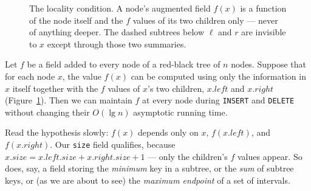 \begin{figure}[H]
\centering
{}
\caption{The locality condition. A node's augmented field $f(x)$ is a function of
the node itself and the $f$ values of its two children only --- never of anything
deeper. The dashed subtrees below $\ell$ and $r$ are invisible to $x$ except
through those two summaries.}
\label{ch14:fig-locality}
\end{figure}

\begin{theorem}
\label{ch14:augment-theorem}
Let $f$ be a field added to every node of a red-black tree of $n$ nodes. Suppose
that for each node $x$, the value $f(x)$ can be computed using only the
information in $x$ itself together with the $f$ values of $x$'s two children,
$x.\mathit{left}$ and $x.\mathit{right}$ (Figure~\ref{ch14:fig-locality}). Then we
can maintain $f$ at every node during \texttt{INSERT} and \texttt{DELETE} without
changing their $O(\lg n)$ asymptotic running time.
\end{theorem}

\begin{remark}
Read the hypothesis slowly: $f(x)$ depends only on $x$, $f(x.\mathit{left})$, and
$f(x.\mathit{right})$. Our \texttt{size} field qualifies, because
$x.\mathit{size} = x.\mathit{left}.\mathit{size} + x.\mathit{right}.\mathit{size}
+ 1$ --- only the children's $f$ values appear. So does, say, a field storing the
\emph{minimum} key in a subtree, or the \emph{sum} of subtree keys, or (as we are
about to see) the \emph{maximum endpoint} of a set of intervals.
\end{remark}

